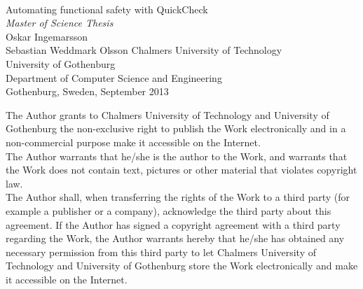 \begin{titlepage}

  \mbox{}
  \vfill
  \addtolength{\voffset}{2cm}
  \begin{flushleft}
    { \\
      {\huge Automating functional safety with QuickCheck} \\
      \emph{\Large Master of Science Thesis} \\[.8cm]

      {\huge Oskar Ingemarsson}\\
      {\huge Sebastian Weddmark Olsson}
      \vfill
      {\normalsize Chalmers University of Technology \\
        University of Gothenburg \\
        Department of Computer Science and Engineering \\
        Gothenburg, Sweden, September 2013 \\
      }
    }
  \end{flushleft}

\end{titlepage}
\ClearShipoutPicture

\vspace*{2.5cm}
The Author grants to Chalmers University of Technology and University of Gothenburg  the non-exclusive right to publish the Work electronically and in a non-commercial purpose make it accessible on the Internet.\\
The Author warrants that he/she is the author to the Work, and warrants that the Work does not contain text, pictures or other material that violates copyright law. \\

The Author shall, when transferring the rights of the Work to a third party (for example a publisher or a company), acknowledge the third party about this agreement. If the Author has signed a copyright agreement with a third party regarding the Work, the Author warrants hereby that he/she has obtained any necessary permission from this third party to let Chalmers University of Technology and University of Gothenburg  store the Work electronically and make it accessible on the Internet.\\[0.6cm]

